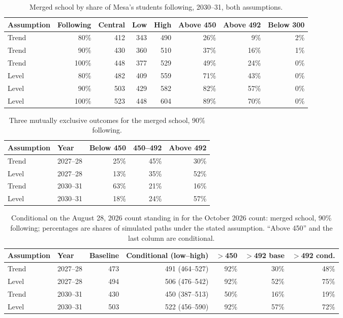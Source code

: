 \documentclass[11pt]{article}
\begin{document}
\begin{table}[htbp]\centering\small
\caption{Merged school by share of Mesa's students following, 2030--31, both assumptions.}\label{tab:scen}
\begin{tabular}{lrrrrrrr}
\toprule
Assumption & Following & Central & Low & High & Above 450 & Above 492 & Below 300 \\
\midrule
Trend & 80\% & 412 & 343 & 490 & 26\% & 9\% & 2\% \\
Trend & 90\% & 430 & 360 & 510 & 37\% & 16\% & 1\% \\
Trend & 100\% & 448 & 377 & 529 & 49\% & 24\% & 0\% \\
Level & 80\% & 482 & 409 & 559 & 71\% & 43\% & 0\% \\
Level & 90\% & 503 & 429 & 582 & 82\% & 57\% & 0\% \\
Level & 100\% & 523 & 448 & 604 & 89\% & 70\% & 0\% \\
\bottomrule
\end{tabular}
\end{table}

\begin{table}[htbp]\centering\small
\caption{Three mutually exclusive outcomes for the merged school, 90\% following.}\label{tab:buckets}
\begin{tabular}{llrrr}
\toprule
Assumption & Year & Below 450 & 450--492 & Above 492 \\
\midrule
Trend & 2027--28 & 25\% & 45\% & 30\% \\
Level & 2027--28 & 13\% & 35\% & 52\% \\
Trend & 2030--31 & 63\% & 21\% & 16\% \\
Level & 2030--31 & 18\% & 24\% & 57\% \\
\bottomrule
\end{tabular}
\end{table}

\begin{table}[htbp]\centering\footnotesize
\caption{Conditional on the August 28, 2026 count standing in for the October 2026 count: merged school, 90\% following; percentages are shares of simulated paths under the stated assumption. ``Above 450'' and the last column are conditional.}\label{tab:cond}
\begin{tabular}{llrrrrr}
\toprule
Assumption & Year & Baseline & Conditional (low--high) & $>$450 & $>$492 base & $>$492 cond. \\
\midrule
Trend & 2027--28 & 473 & 491 (464--527) & 92\% & 30\% & 48\% \\
Level & 2027--28 & 494 & 506 (476--542) & 92\% & 52\% & 75\% \\
Trend & 2030--31 & 430 & 450 (387--513) & 50\% & 16\% & 19\% \\
Level & 2030--31 & 503 & 522 (456--590) & 92\% & 57\% & 72\% \\
\bottomrule
\end{tabular}
\end{table}
\end{document}
